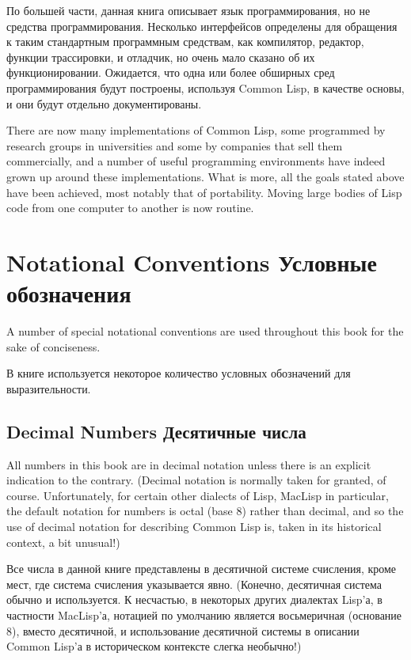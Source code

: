 По большей части, данная книга описывает язык программирования, но не средства
программирования. Несколько интерфейсов определены для обращения к таким
стандартным программным средствам, как компилятор, редактор, функции
трассировки, и отладчик, но очень мало сказано об их
функционировании. Ожидается, что одна или более обширных сред программирования
будут построены, используя Common Lisp, в качестве основы, и они будут отдельно
документированы. 

\begin{newer}
There are now many implementations of Common Lisp,
some programmed by research groups in universities
and some by companies that sell them commercially,
and a number of useful
programming environments have indeed grown up around
these implementations.
What is more, all the goals stated above have been achieved,
most notably that of portability.  Moving large bodies
of Lisp code from one computer to another is now routine.
\end{newer}

\section{Notational Conventions Условные обозначения}

A number of special notational conventions are used throughout this book
for the sake of conciseness.

В книге используется некоторое количество условных обозначений для выразительности. 

\subsection{Decimal Numbers Десятичные числа}

All numbers in this book are in decimal notation unless
there is an explicit indication to the contrary.
(Decimal notation is normally taken for granted, of course.
Unfortunately, for certain other dialects of Lisp, MacLisp in particular,
the default notation for numbers is octal (base 8) rather than decimal,
and so the use of decimal notation for describing Common Lisp is,
taken in its historical context, a bit unusual!)

Все числа в данной книге представлены в десятичной системе счисления, кроме мест,
где система счисления указывается явно. 
(Конечно, десятичная система обычно и используется.
К несчастью, в некоторых других диалектах Lisp'а, в частности MacLisp'а,
нотацией по умолчанию является восьмеричная (основание 8), вместо десятичной, и
использование десятичной системы в описании Common Lisp'а в историческом
контексте слегка необычно!) 


